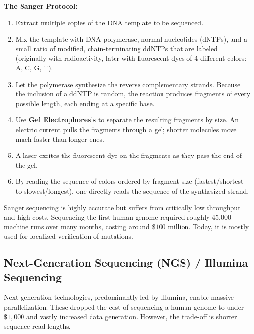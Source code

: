 \textbf{The Sanger Protocol:}
\begin{enumerate}
  \item Extract multiple copies of the DNA template to be sequenced.
  \item Mix the template with DNA polymerase, normal nucleotides (dNTPs), and a small ratio of modified, chain-terminating ddNTPs that are labeled (originally with radioactivity, later with fluorescent dyes of 4 different colors: A, C, G, T).
  \item Let the polymerase synthesize the reverse complementary strands. Because the inclusion of a ddNTP is random, the reaction produces fragments of every possible length, each ending at a specific base.
  \item Use \textbf{Gel Electrophoresis} to separate the resulting fragments by size. An electric current pulls the fragments through a gel; shorter molecules move much faster than longer ones.
  \item A laser excites the fluorescent dye on the fragments as they pass the end of the gel.
  \item By reading the sequence of colors ordered by fragment size (fastest/shortest to slowest/longest), one directly reads the sequence of the synthesized strand.
\end{enumerate}


Sanger sequencing is highly accurate but suffers from critically low throughput and high costs. Sequencing the first human genome required roughly 45,000 machine runs over many months, costing around $\$100$ million. Today, it is mostly used for localized verification of mutations.

\subsection{Next-Generation Sequencing (NGS) / Illumina Sequencing}
Next-generation technologies, predominantly led by Illumina, enable massive parallelization. These dropped the cost of sequencing a human genome to under $\$1,000$ and vastly increased data generation. However, the trade-off is shorter sequence read lengths.

